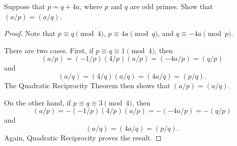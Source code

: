  Suppose that $p = q + 4a$, where $p$ and $q$ are odd
primes. Show that $(a/p) = (a/q)$.
\begin{proof}
  Note that $p\equiv q\pmod4$, $p\equiv4a\pmod{q}$, and
  $q\equiv-4a\pmod{p}$.

  There are two cases. First, if $p\equiv q\equiv1\pmod4$, then
  \begin{equation*}
    (a/p) = (-1/p)(4/p)(a/p) = (-4a/p) = (q/p)
  \end{equation*}
  and
  \begin{equation*}
    (a/q) = (4/q)(a/q) = (4a/q) = (p/q).
  \end{equation*}
  The Quadratic Reciprocity Theorem then shows that $(a/p) = (a/q)$.

  On the other hand, if $p\equiv q\equiv3\pmod4$, then
  \begin{equation*}
    (a/p) = -(-1/p)(4/p)(a/p) = -(-4a/p) = -(q/p)
  \end{equation*}
  and
  \begin{equation*}
    (a/q) = (4a/q) = (p/q).
  \end{equation*}
  Again, Quadratic Reciprocity proves the result.
\end{proof}
